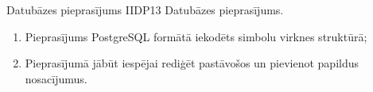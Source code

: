 \parameterTable
{Datubāzes pieprasījums}
{IIDP13}
{
	Datubāzes pieprasījums.
}
{
	\begin{enumerate}
		\item Pieprasījums PostgreSQL formātā iekodēts simbolu virknes struktūrā;
		\item Pieprasījumā jābūt iespējai rediģēt pastāvošos un pievienot papildus nosacījumus.
	\end{enumerate}
}
{
}
